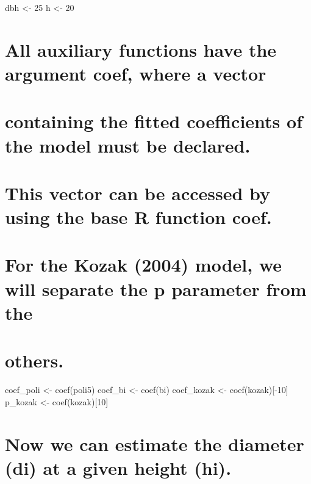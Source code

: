 \documentclass[
]{article}
\begin{document}
dbh \textless- 25 h \textless- 20

\hypertarget{all-auxiliary-functions-have-the-argument-coef-where-a-vector}{%
\section{All auxiliary functions have the argument coef, where a
vector}\label{all-auxiliary-functions-have-the-argument-coef-where-a-vector}}

\hypertarget{containing-the-fitted-coefficients-of-the-model-must-be-declared.}{%
\section{containing the fitted coefficients of the model must be
declared.}\label{containing-the-fitted-coefficients-of-the-model-must-be-declared.}}

\hypertarget{this-vector-can-be-accessed-by-using-the-base-r-function-coef.}{%
\section{This vector can be accessed by using the base R function
coef.}\label{this-vector-can-be-accessed-by-using-the-base-r-function-coef.}}

\hypertarget{for-the-kozak-2004-model-we-will-separate-the-p-parameter-from-the}{%
\section{For the Kozak (2004) model, we will separate the p parameter
from
the}\label{for-the-kozak-2004-model-we-will-separate-the-p-parameter-from-the}}

\hypertarget{others.}{%
\section{others.}\label{others.}}

coef\_poli \textless- coef(poli5) coef\_bi \textless- coef(bi)
coef\_kozak \textless- coef(kozak){[}-10{]} p\_kozak \textless-
coef(kozak){[}10{]}

\hypertarget{now-we-can-estimate-the-diameter-di-at-a-given-height-hi.}{%
\section{Now we can estimate the diameter (di) at a given height
(hi).}\label{now-we-can-estimate-the-diameter-di-at-a-given-height-hi.}}
\end{document}
